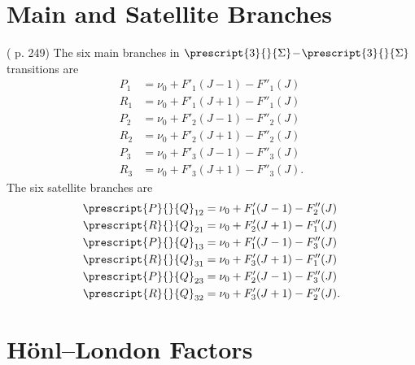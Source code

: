 \documentclass[11pt, twoside, fleqn]{report}
\newcommand{\dash}{\!-\!}
\newcommand{\state}[2]{\prescript{#1}{}{#2}}
\begin{document}
\section{Main and Satellite Branches}

(\cite{herzbergMolecularSpectraMolecular1950} p. 249) The six main branches in $\state{3}{\Sigma}\dash\state{3}{\Sigma}$ transitions are
\begin{align*}
    P_1 & = \nu_0 + F'_1(J - 1) - F''_1(J)  \\
    R_1 & = \nu_0 + F'_1(J + 1) - F''_1(J)  \\
    P_2 & = \nu_0 + F'_2(J - 1) - F''_2(J)  \\
    R_2 & = \nu_0 + F'_2(J + 1) - F''_2(J)  \\
    P_3 & = \nu_0 + F'_3(J - 1) - F''_3(J)  \\
    R_3 & = \nu_0 + F'_3(J + 1) - F''_3(J).
\end{align*}
The six satellite branches are
\begin{align*}
    \state{P}{Q}_{12} & = \nu_0 + F'_1(J - 1) - F''_2(J)  \\
    \state{R}{Q}_{21} & = \nu_0 + F'_2(J + 1) - F''_1(J)  \\
    \state{P}{Q}_{13} & = \nu_0 + F'_1(J - 1) - F''_3(J)  \\
    \state{R}{Q}_{31} & = \nu_0 + F'_3(J + 1) - F''_1(J)  \\
    \state{P}{Q}_{23} & = \nu_0 + F'_2(J - 1) - F''_3(J)  \\
    \state{R}{Q}_{32} & = \nu_0 + F'_3(J + 1) - F''_2(J).
\end{align*}

\section{H\"onl--London Factors}
\end{document}
